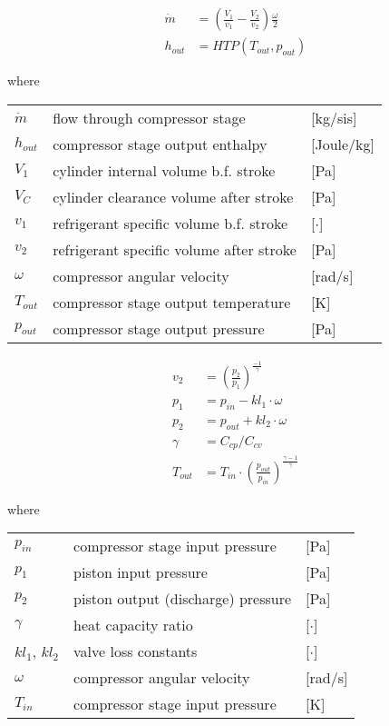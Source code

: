 \begin{align}
	\dot{m} &= \left(\frac{V_1}{v_1} - \frac{V_2}{v_2}\right) \frac{\omega}{2} \\
	h_{out} &= HTP(T_{out}, p_{out}) 
\end{align}

where

\begin{center}
	\begin{tabular}{l p{8cm} l}
		$\dot{m}$				& flow through compressor stage					& [\si{kg}/si{s}]\\ 
		$h_{out}$				& compressor stage output enthalpy				& [\si{Joule}/\si{kg}]\\ 
		$V_1$					& cylinder internal volume b.f. stroke			& [\si{Pa}]\\ 
		$V_C$					& cylinder clearance volume after stroke		& [\si{Pa}]\\ 
		$v_1$					& refrigerant specific volume b.f. stroke		& [$ \cdot $]\\
		$v_2$					& refrigerant specific volume after stroke		& [\si{Pa}]\\
		$\omega$ 				& compressor angular velocity 					& [\si{rad}/\si{s}]\\
		$T_{out}$ 				& compressor stage output temperature 			& [\si{K}]\\
		$p_{out}$				& compressor stage output pressure 				& [\si{Pa}]\\
	\end{tabular}
\end{center}

\begin{align}
	v_2 &= \left(\frac{p_2}{p_1}\right)^{\frac{-1}{\gamma}} \\
	p_1 &= p_{in} - kl_1 \cdot \omega \\
	p_2 &= p_{out} + kl_2 \cdot \omega \\
	\gamma &= C_{cp}/C_{cv} \\
	T_{out} &= T_{in}\cdot \left(\frac{p_{out}}{p_{in}}\right)^{\frac{\gamma-1}{\gamma}}
\end{align}

where 

\begin{center}
	\begin{tabular}{l p{8cm} l}
		$p_{in}$				& compressor stage input pressure 			& [\si{Pa}]\\
		$p_1$					& piston input pressure						& [\si{Pa}]\\ 
		$p_2$					& piston output (discharge) pressure 		& [\si{Pa}]\\ 
		$\gamma$				& heat capacity ratio 						& [$ \cdot $]\\
		$ kl_1$, $kl_2$			& valve loss constants						& [$ \cdot $]\\
		$\omega$ 				& compressor angular velocity 				& [\si{rad}/\si{s}]\\
		$T_{in}$ 				& compressor stage input pressure 			& [\si{K}]\\
	\end{tabular}
\end{center}

